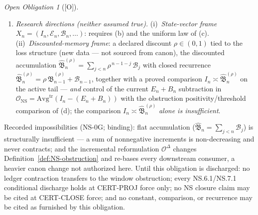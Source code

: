 \documentclass[12pt,oneside]{amsbook}
\theoremstyle{plain}
\theoremstyle{definition}
\theoremstyle{remark}
\newtheorem{obligation}[theorem]{Open Obligation}
\newcommand{\status}[1]{\textup{[#1]}}
\begin{document}
\begin{obligation}[\status{O}]
\begin{enumerate}[label=\textup{(\alph*)}]
 successor-defect quantity $\mathfrak{D}_n$; and the Stage-2a
 defect-burden operator $D_n$ (an operator, never ledger
 shorthand). Discharge must supply an explicit, typed map from
 the Book~II ledger $\mathcal{D}_n$ to the branch state
 $\mathfrak{D}_n$ specifying: the temporal index; the
 window/averaging convention; the normalization; the transfer of
 the H1/H2 lower bounds
 ($\Phi^{\mathrm{quot}}_n \geq c_1\,\mathfrak{D}_n$,
 $\Phi^{\mathrm{mix}}_n \geq c_2\,\mathfrak{D}_n$) between the
 two states; the transfer of the loss/renewal recurrence
 ($\mathcal{D}$-side SCT.6b recurrence
 $\to$ $\mathfrak{D}$-side
 $\mathfrak{D}_{k+1} \leq \mathfrak{D}_k - \Phi_k + \Psi_k$);
 the same-state obstruction comparison of part~(d); preservation
 of nonnegativity; \emph{and the positive contraction-factor
 domain}: the resulting factor
 $\widetilde\kappa = 1-(1-\widetilde\eta)(c_1+c_2)$ must be
 furnished in $(0,1)$ (equivalently
 $0 < (1-\widetilde\eta)(c_1+c_2) < 1$), or the discharge must
 treat the extinction case
 $(1-\widetilde\eta)(c_1+c_2) \geq 1$ (which forces
 $\mathfrak{D} = 0$ in finitely many steps by nonnegativity)
 separately. Until this map is discharged, \emph{no recurrence,
 lower bound, or comparison may pass between $\mathcal{D}_n$ and
 $\mathfrak{D}_n$}, and no logarithmic threshold or geometric
 rate may be stated for $\widetilde\kappa$.
 \item \emph{Research directions (neither assumed true).}
 (i)~\emph{State-vector frame}
 $X_n = (I_n, \mathcal{E}_n, \mathcal{B}_n, \dots)$: requires
 (b) and the uniform law of (c). (ii)~\emph{Discounted-memory
 frame}: a declared discount $\rho \in (0,1)$ tied to the loss
 structure (new data --- not sourced from canon), the discounted
 accumulation
 $\widehat{\mathfrak{B}}^{(\rho)}_n
 = \sum_{j<n} \rho^{\,n-1-j}\,\mathcal{B}_j$ with closed
 recurrence
 $\widehat{\mathfrak{B}}^{(\rho)}_n
 = \rho\,\widehat{\mathfrak{B}}^{(\rho)}_{n-1}
 + \mathcal{B}_{n-1}$, together with a proved comparison
 $I_n \asymp \widehat{\mathfrak{B}}^{(\rho)}_n$ on the active
 tail --- \emph{and} control of the current $E_n + B_n$
 subtraction in
 $\mathcal{O}_{\mathrm{NS}} =
 \mathrm{Avg}^{\mathrm{tr}}(I_n - (E_n + B_n))$ with the
 obstruction positivity/threshold comparison of (d); the
 comparison $I_n \asymp \widehat{\mathfrak{B}}^{(\rho)}_n$
 \emph{alone is insufficient}.
\end{enumerate}
Recorded impossibilities (NS-0G; binding): flat accumulation
($\widehat{\mathfrak{B}}_n = \sum_{j<n}\mathcal{B}_j$) is
structurally insufficient --- a sum of nonnegative increments is
non-decreasing and never contracts; and the incremental
reformulation $\mathcal{O}^{\Delta}$ changes
Definition~\ref{def:NS-obstruction} and re-bases every downstream
consumer, a heavier canon change not authorized here. Until this
obligation is discharged: no ledger contraction transfers to the
window obstruction; every NS.6.1/NS.7.1 conditional discharge holds
at CERT-PROJ force only; no NS closure claim may be cited at
CERT-CLOSE force; and no constant, comparison, or recurrence may be
cited as furnished by this obligation.
\end{obligation}
\end{document}
